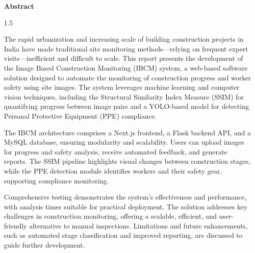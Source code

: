 \documentclass[12pt,a4paper]{report}
\renewenvironment{abstract}{
    \clearpage
    \phantomsection
    \addcontentsline{toc}{chapter}{Abstract}  %
    \vspace*{-1cm}
    \begin{center}
        \Huge\bfseries Abstract
    \end{center}
    \vspace{0.5cm}
    \begin{spacing}{1.5}
}{
    \end{spacing}
    \vspace{1cm}
    \clearpage
}
\begin{document}
\begin{abstract}
    The rapid urbanization and increasing scale of building construction projects in India have made traditional site monitoring methods—relying on frequent expert visits—inefficient and difficult to scale. This report presents the development of the Image Based Construction Monitoring (IBCM) system, a web-based software solution designed to automate the monitoring of construction progress and worker safety using site images. The system leverages machine learning and computer vision techniques, including the Structural Similarity Index Measure (SSIM) for quantifying progress between image pairs and a YOLO-based model for detecting Personal Protective Equipment (PPE) compliance.

    The IBCM architecture comprises a Next.js frontend, a Flask backend API, and a MySQL database, ensuring modularity and scalability. Users can upload images for progress and safety analysis, receive automated feedback, and generate reports. The SSIM pipeline highlights visual changes between construction stages, while the PPE detection module identifies workers and their safety gear, supporting compliance monitoring.

    Comprehensive testing demonstrates the system's effectiveness and performance, with analysis times suitable for practical deployment. The solution addresses key challenges in construction monitoring, offering a scalable, efficient, and user-friendly alternative to manual inspections. Limitations and future enhancements, such as automated stage classification and improved reporting, are discussed to guide further development.
\end{abstract}


{}
\tableofcontents
\clearpage
{}
\listoffigures
{}
\clearpage
{}
\listoftables
{}
\clearpage
\renewcommand\listoflistingscaption{List of Code}
\listoflistings
{}
\clearpage
\end{document}
